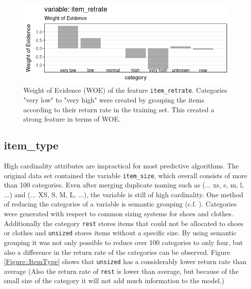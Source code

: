 \documentclass[a4paper,12pt]{article}
\begin{document}
 \begin{figure}
  \begin{minipage}[c]{0.65\textwidth}
    \includegraphics[width=\textwidth]{pictures/item_retrate_woe.png}
  \end{minipage}\hfill
  \begin{minipage}[c]{0.35\textwidth}
    \caption{Weight of Evidence (WOE) of the feature \texttt{item\_retrate}. Categories "very low" to "very high" were created by grouping the items  according to their return rate in the training set. This created a strong feature in terms of WOE.} \label{Figure::ItemRetrateWOE}
  \end{minipage}
\end{figure}

\subsection{item\_type}
High cardinality attributes are impractical for most predictive algorithms. The original data set contained the variable \texttt{item\_size}, which overall consists of more than 100 categories. Even after merging duplicate naming such as (... xs, s, m, l, ...) and (... XS, S, M, L, ...), the variable is still of high cardinality. One method of reducing the categories of a variable is semantic grouping (c.f. \cite{moeyersoms2015}). Categories were generated with respect to common sizing systems for shoes and clothes. Additionally the category \texttt{rest} stores items that could not be allocated to shoes or clothes and \texttt{unsized} stores items without a specific size. By using semantic grouping it was not only possible to reduce over 100 categories to only four, but also a difference in the return rate of the categories can be observed. Figure \ref{Figure::ItemType} shows that \texttt{unsized} has a considerably lower return rate than average (Also the return rate of \texttt{rest} is lower than average, but because of the small size of the category it will not add much information to the model.)
\end{document}
